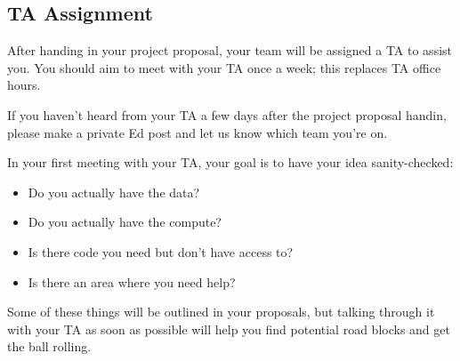 \subsection*{TA Assignment}

After handing in your project proposal, your team will be assigned a TA to assist you.
You should aim to meet with your TA once a week; this replaces TA office hours.

If you haven't heard from your TA a few days after the project proposal handin, please make a private Ed post and let us know which team you're on.

In your first meeting with your TA, your goal is to have your idea sanity-checked:

\begin{itemize}
  \item Do you actually have the data?
  \item Do you actually have the compute?
  \item Is there code you need but don't have access to?
  \item Is there an area where you need help?
\end{itemize}

Some of these things will be outlined in your proposals, but talking through it with your TA as soon as possible will help you find potential road blocks and get the ball rolling.

